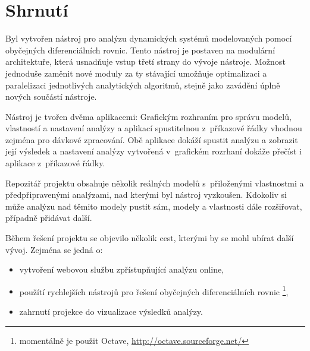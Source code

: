 \documentclass{parasim}
\begin{document}
\section{Shrnutí}

Byl vytvořen nástroj pro analýzu dynamických systémů modelovaných pomocí
obyčejných diferenciálních rovnic. Tento nástroj je postaven na modulární architektuře,
která usnadňuje vstup třetí strany do vývoje nástroje. Možnost jednoduše zaměnit nové moduly
za ty stávající umožňuje optimalizaci a paralelizaci jednotlivých analytických algoritmů,
stejně jako zavádění úplně nových součástí nástroje.

Nástroj je tvořen dvěma aplikacemi: Grafickým rozhraním pro správu modelů, vlastností a nastavení analýzy
a aplikací spustitelnou z~příkazové řádky vhodnou zejména pro dávkové zpracování. Obě aplikace dokáží spustit
analýzu a zobrazit její výsledek a nastavení analýzy vytvořená v~grafickém rozrhaní dokáže přečíst i aplikace
z~příkazové řádky.

Repozitář projektu obsahuje několik reálných modelů s~přiloženými vlastnostmi a předpřipravenými analýzami,
nad kterými byl nástroj vyzkoušen. Kdokoliv si může analýzu nad těmito modely pustit sám, modely
a vlastnosti dále rozšiřovat, případně přidávat další.

Během řešení projektu se objevilo několik cest, kterými by se mohl ubírat další vývoj. Zejména se jedná o:

\begin{itemize}
	\item	vytvoření webovou službu zpřístupňující analýzu online,
	\item	použítí rychlejších nástrojů pro řešení obyčejných diferenciálních rovnic \footnote{momentálně je použit Octave, \url{http://octave.sourceforge.net/}},
	\item	zahrnutí projekce do vizualizace výsledků analýzy.
\end{itemize}
\end{document}
